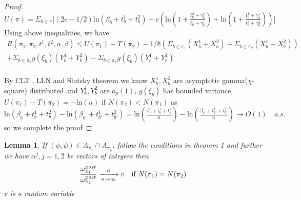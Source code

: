 \documentclass[aoas,preprint]{imsart}
\newtheorem{lemma}{Lemma}
\begin{document}
\begin{proof}
$U(\pi) = \Sigma_{b\in\pi}\big[(2c - 1/2) \text{ln}(\beta_b + t_b^1 + t_b^2) 
  - c(\text{ln}(1 + \frac{t_b^2 + \gamma_b^2}{t_b^1 + \gamma_b^1}) + \text{ln}(1 + \frac{t_b^1 + \gamma_b^1}{t_b^2 + \gamma_b^2}))\big]$\\
  
 Using above inequalities, we have 
 \begin{eqnarray*}
  R(\pi_1, \pi_2, t^1, t^2, \alpha, \beta)  \leq U(\pi_1) - T(\pi_2) - 1/8 (\Sigma_{b\in\pi_1}(X_b^1 + X_b^2) - \Sigma_{b\in\pi_2}(X_b^1 + X_b^2)) \\ 
 + \Sigma_{b\in\pi_1}g(\xi_b)(Y_b^1 + Y_b^2)  - \Sigma_{b\in\pi_2}g(\xi_ b)(Y_b^1 + Y_b^2)\\
 \end{eqnarray*}
 
 By CLT , LLN and Slutsky theorem we know $X_b^1, X_b^2$ are asymptotic gamma($\chi$-square) distributed and $Y_b^1, Y_b^2$ are $o_p(1)$, $g(\xi_b)$ has bounded variance, $U(\pi_1) - T(\pi_2) = -\text{ln}(n)$ if $N(\pi_2) < N(\pi_1)$
 as $ \text{ln}(\beta_b + t_b^1 + t_b^2)  -  \text{ln}(\beta_{b'} + t_{b'}^1 + t_{b'}^2) =  \text{ln}(\frac{\beta_b + t_b^1 + t_b^2}{n})  -  \text{ln}(\frac{\beta_{b'} + t_{b'}^1 + t_{b'}^2}{n}) \rightarrow O(1) \quad a.s.$ so we complete the proof




\end{proof}


\begin{lemma}
 If $(\phi, \psi) \in A_{\pi_1} \cap A_{\pi_2}$, follow the conditions in theorem 1 and further we have $\alpha^j, j = 1,2$ be vectors of integers then 
\begin{eqnarray*}
 \frac{\omega_{\pi_1}^{\text post}}{\omega_{\pi_2}^{\text post}} \xrightarrow[n\rightarrow\infty]{\text{d}} v \quad \text{if } N(\pi_1) = N(\pi_2)\\
\end{eqnarray*}
$v$ is a random variable
\end{lemma}
\end{document}
